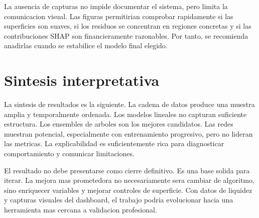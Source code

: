La ausencia de capturas no impide documentar el sistema, pero limita la comunicacion visual. Las figuras permitirian comprobar rapidamente si las superficies son suaves, si los residuos se concentran en regiones concretas y si las contribuciones SHAP son financieramente razonables. Por tanto, se recomienda anadirlas cuando se estabilice el modelo final elegido.

\section{Sintesis interpretativa}

La sintesis de resultados es la siguiente. La cadena de datos produce una muestra amplia y temporalmente ordenada. Los modelos lineales no capturan suficiente estructura. Los ensembles de arboles son los mejores candidatos. Las redes muestran potencial, especialmente con entrenamiento progresivo, pero no lideran las metricas. La explicabilidad es suficientemente rica para diagnosticar comportamiento y comunicar limitaciones.

El resultado no debe presentarse como cierre definitivo. Es una base solida para iterar. La mejora mas prometedora no necesariamente sera cambiar de algoritmo, sino enriquecer variables y mejorar controles de superficie. Con datos de liquidez y capturas visuales del dashboard, el trabajo podria evolucionar hacia una herramienta mas cercana a validacion profesional.
